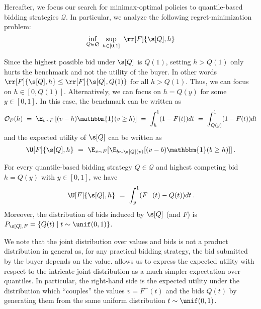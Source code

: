 Hereafter, we focus our search for minimax-optimal policies to quantile-based bidding strategies $\mathcal Q$. In particular, we analyze the following regret-minimization problem:
\begin{equation*}
    \inf_{Q \in \mathcal{Q}}\ \sup_{h \in [0,1]}\ \rr[F]{\s[Q],h}
\end{equation*}




 Since the highest possible bid under $\s[Q]$ is $Q(1)$, setting $h > Q(1)$ only hurts the benchmark and not the utility of the buyer. In other words $\rr[F]{\s[Q],h} \leq \rr[F]{\s[Q],Q(1)}$ for all $h > Q(1)$. Thus, we can focus on $h \in [0,Q(1)]$. Alternatively, we can focus on $h = Q(y)$ for some $y \in[0,1]$. In this case, the benchmark can be written as
\begin{align*}
	\mathcal{O}_{F}(h)\ =\ \E_{v \sim F}\left[\mathcal(v-h)\mathbbm{1}(v \geq h) \right]\ =\ \int_{h}^1 (1 - F(t)) dt\ =\ \int_{Q(y)}^1 (1 - F(t)) dt
\end{align*}
and the expected utility of $\s[Q]$ can be written as
\begin{align*}
	\U[F]{\s[Q], h}\ =\ \E_{v \sim F}[ \E_{b \sim \s[Q](v)} [(v - b) \mathbbm{1}(b \geq h)]]\,.
\end{align*}

\begin{lemma}\label{lemma:quantile-based-bidding}
	For every quantile-based bidding strategy $Q \in \mathcal{Q}$ and highest competing bid $h = Q(y)$ with $y \in [0,1]$, we have
	\begin{align*}
		\U[F]{\s[Q], h}\ =\ \int_y^1 (F^-(t) - Q(t))dt\,.
	\end{align*}
    Moreover, the distribution of bids induced by $\s[Q]$ (and $F$) is $P_{\s[Q], F} = \{Q(t) \mid t \sim \unif(0,1)\}$.
\end{lemma}

We note that the joint distribution over values and bids is not a product distribution in general as, for any practical bidding strategy, the bid submitted by the buyer depends on the value. 
 allows us to express the expected utility with respect to the intricate joint distribution as a much simpler expectation over quantiles. In particular, the right-hand side is the expected utility under the distribution which ``couples'' the values $v = F^-(t)$ and the bids $Q(t)$ by generating them from the same uniform distribution $t \sim \unif(0,1)$. 


